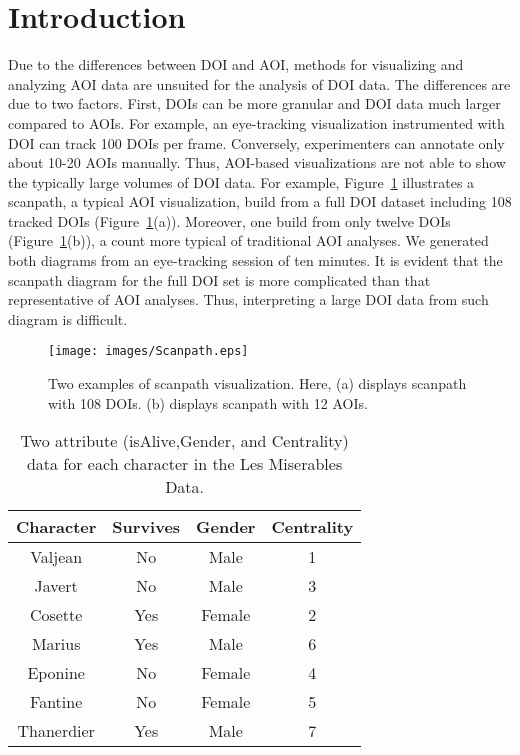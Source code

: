 \section{Introduction}
Due to the differences between DOI and AOI, methods for visualizing and analyzing AOI data are unsuited for the analysis of DOI data. The differences are due to two factors. First, DOIs can be more granular and DOI data much larger compared to AOIs. For example, an eye-tracking visualization instrumented with DOI can track 100 DOIs per frame. Conversely, experimenters can annotate only about 10-20 AOIs manually. Thus, AOI-based visualizations are not able to show the typically large volumes of DOI data. For example, Figure~\ref{fig:Scanpath} illustrates a scanpath, a typical AOI visualization,  build from a full DOI dataset including 108 tracked DOIs (Figure~\ref{fig:Scanpath}(a)). Moreover, one build from only twelve DOIs (Figure~\ref{fig:Scanpath}(b)), a count more typical of traditional AOI analyses. We generated both diagrams from an eye-tracking session of ten minutes. It is evident that the scanpath diagram for the full DOI set is more complicated than that representative of AOI analyses. Thus, interpreting a large DOI data from such diagram is difficult. 

\begin{figure}[htb]
  \centering
  \texttt{[image: images/Scanpath.eps]}
  \caption{Two examples of scanpath visualization. Here, (a) displays scanpath with 108 DOIs. (b) displays scanpath with 12 AOIs. }
	\label{fig:Scanpath}
\end{figure}

\begin{table}[htbp]
	\centering
		\begin{tabular}{|c|c|c|c|}
				\hline
				\textbf{Character}	& \textbf{Survives} &	\textbf{Gender}	& \textbf{Centrality}\\\hline
			
				Valjean	& No	&Male	&1\\\hline
Javert	&No&	Male&	3\\\hline
Cosette 	&Yes	&Female&	2\\\hline
Marius	&Yes	&Male&	6\\\hline
Eponine	&No	&Female&	4\\\hline
Fantine	&No	&Female	&5\\\hline
Thanerdier	&Yes	&Male	&7\\\hline

		\end{tabular}
		\caption{Two attribute (isAlive,Gender, and Centrality) data for each character in the Les Miserables Data. }
		\label{tab:LesMiserablesAttribute}
\end{table}

